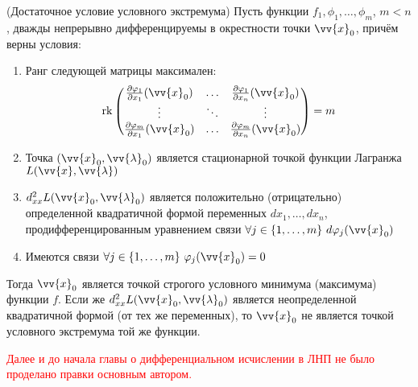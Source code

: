 \begin{theorem} (Достаточное условие условного экстремума)
    Пусть функции $f_1, \phi_1, \dots, \phi_m$, $m < n$, дважды непрерывно дифференцируемы в окрестности точки $\vv{x}_0$, причём верны условия:
    \begin{enumerate}
    	\item Ранг следующей матрицы максимален:
    	\[
    		\rk \begin{pmatrix}
	    		\frac{\vdelta \phi_1}{\vdelta x_1}(\vv{x}_0) & \dots & \frac{\vdelta \phi_1}{\vdelta x_n}(\vv{x}_0)
	    		\\
	    		\vdots & \ddots & \vdots
	    		\\
	    		\frac{\vdelta \phi_m}{\vdelta x_1}(\vv{x}_0) & \dots & \frac{\vdelta \phi_m}{\vdelta x_n}(\vv{x}_0)
	    		\\
    		\end{pmatrix} = m
    	\]
    	
    	\item Точка $(\vv{x}_0, \vv{\lambda}_0)$ является стационарной точкой функции Лагранжа $L(\vv{x}, \vv{\lambda})$
    	
    	\item $d^2_{xx}L(\vv{x}_0, \vv{\lambda}_0)$ является положительно (отрицательно) определенной квадратичной формой переменных $dx_1, \ldots, dx_n$, продифференцированным уравнением связи $\forall j \in \range{m}\ d\phi_j(\vv{x}_0)$
    	
    	\item Имеются связи $\forall j \in \range{m}\ \phi_j(\vv{x}_0) = 0$
    \end{enumerate}
	Тогда $\vv{x}_0$ является точкой строгого условного минимума (максимума) функции $f$. Если же $d^2_{xx} L(\vv{x}_0, \vv{\lambda}_0)$ является неопределенной квадратичной формой (от тех же переменных), то $\vv{x}_0$ не является точкой условного экстремума той же функции.
\end{theorem}

\textcolor{red}{Далее и до начала главы о дифференциальном исчислении в ЛНП не было проделано правки основным автором.}

